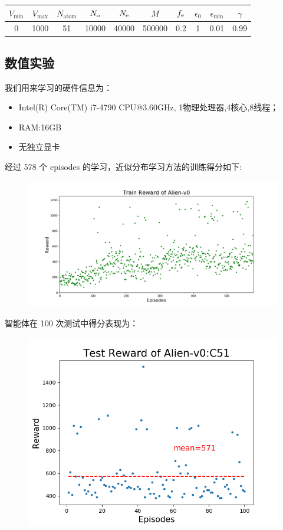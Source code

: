 \documentclass[UTF8]{ctexart}
\begin{document}
\begin{itemize}
\begin{table}[h]
\begin{tabular}{|c|c|c|c|c|c|c|c|c|c|}
$V_{\min}$ &$V_{\max}$	&$N_{\text{atom}}$ &$N_{\text o}$ &$N_{\text e}$	&$M$&$f_{\text e}$	&$\epsilon_0$
&$\epsilon_{\min}$&$\gamma$\\ \hline
0& 1000 & 51& 10000& 40000	& 500000& 0.2& 1& 0.01& 0.99	 \\ \hline
\end{tabular}
\end{table}
\end{itemize}
\subsection{数值实验}
我们用来学习的硬件信息为：
\begin{itemize}
\item Intel(R) Core(TM) i7-4790 CPU@3.60GHz, 1物理处理器,4核心,8线程；
\item RAM:16GB
\item 无独立显卡
\end{itemize}
经过 578 个 episodes 的学习，近似分布学习方法的训练得分如下:
\begin{figure}[H]
\centering
\includegraphics[scale=.55]{alien_train.png}
\end{figure}
智能体在 100 次测试中得分表现为：
\begin{figure}[H]
\centering
\includegraphics[scale=.8]{alien_c51.png}
\end{figure}
\end{document}
